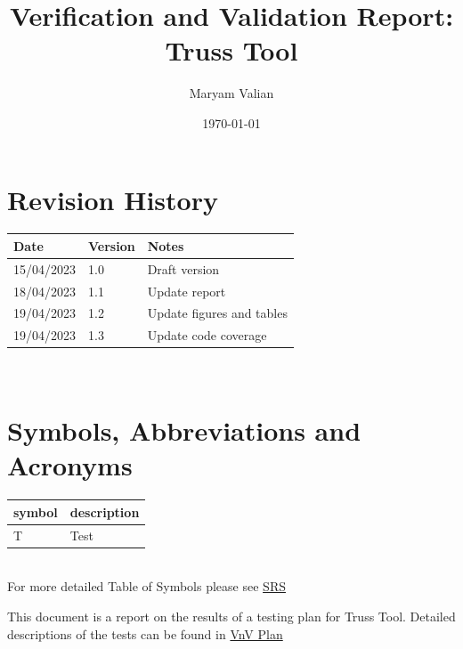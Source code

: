 \documentclass[12pt, titlepage]{article}
\begin{document}
\title{Verification and Validation Report: Truss Tool} 
\author{Maryam Valian}
\date{\today}
	
\maketitle


\section{Revision History}

\begin{tabularx}{\textwidth}{p{3cm}p{2cm}X}
\toprule {\bf Date} & {\bf Version} & {\bf Notes}\\
\midrule
15/04/2023 & 1.0 & Draft version\\
18/04/2023 & 1.1 & Update report\\
19/04/2023 & 1.2 & Update figures and tables\\
19/04/2023 & 1.3 & Update code coverage\\
\bottomrule
\end{tabularx}

~\newpage

\section{Symbols, Abbreviations and Acronyms}

\renewcommand{\arraystretch}{1.2}
\begin{tabular}{l l} 
  \toprule		
  \textbf{symbol} & \textbf{description}\\
  \midrule 
  T & Test\\
  \bottomrule
\end{tabular}\\

For more detailed Table of Symbols please see \href{https://github.com/Maryamvalian/project741/blob/cfe06182f41c842e3b44aa0eb33d661cf8a3ce79/docs/SRS/SRS.pdf}{SRS}
\newpage

\tableofcontents

\listoftables %

\listoffigures %

\newpage


This document is a report on the results of a testing plan for Truss Tool.
Detailed descriptions of the tests can be found in \href{https://github.com/Maryamvalian/project741/blob/cfe06182f41c842e3b44aa0eb33d661cf8a3ce79/docs/VnVPlan/VnVPlan.pdf}{VnV Plan}
\end{document}
